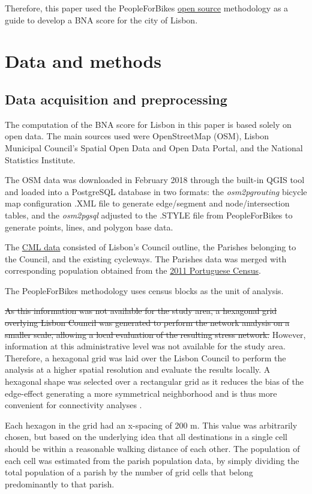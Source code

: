 \documentclass[information,article,submit,moreauthors,Latex,dvi2pdf,10pt,a4paper]{Definitions/mdpi}
\begin{document}
Therefore, this paper used the PeopleForBikes \href{https://github.com/azavea/pfb-network-connectivity}{open source} methodology as a guide to develop a BNA score for the city of Lisbon.

\section{Data and methods} \label {methods}

\subsection{Data acquisition and preprocessing} \label{data}

The computation of the BNA score for Lisbon in this paper is based solely on open data. The main sources used were OpenStreetMap (OSM), Lisbon Municipal Council's Spatial Open Data and Open Data Portal, and the National Statistics Institute.

The OSM data was downloaded in February 2018 through the built-in QGIS tool and loaded into a PostgreSQL database in two formats: the \textit{osm2pgrouting} bicycle map
configuration .XML file to generate edge/segment and node/intersection tables, and the \textit{osm2pgsql} adjusted to the .STYLE file from PeopleForBikes to generate points, lines, and polygon base data.

The \href{http://geodados.cm-lisboa.pt/}{CML data} consisted of Lisbon's Council  outline, the Parishes belonging to the Council, and the existing cycleways. The Parishes data was merged with corresponding population obtained from the \href{http://censos.ine.pt/}{2011 Portuguese Census}.

The PeopleForBikes methodology uses census blocks as the unit of analysis.
\begin{mycolorbox}[colback=yellow]
\sout{As this information was not available for the study area, a hexagonal grid overlying Lisbon Council was generated to perform the network analysis on a smaller scale, allowing a local evaluation of the resulting stress network.} However, information at this administrative level was not available for the study area. Therefore, a hexagonal grid was laid over the Lisbon Council to perform the analysis at a higher spatial resolution and evaluate the results locally. A hexagonal shape was selected over a rectangular grid as it reduces the bias of the edge-effect generating a more symmetrical neighborhood and is thus more convenient for connectivity analyses \cite{Birch2007}.
\end{mycolorbox}
Each hexagon in the grid had an x-spacing of 200 m. This value was arbitrarily chosen, but based on the underlying idea that all destinations in a single cell should be within a reasonable walking distance of each other. The population of each cell was estimated from the parish population data, by simply dividing the total population of a parish by the number of grid cells that belong predominantly to that parish.
\end{document}
